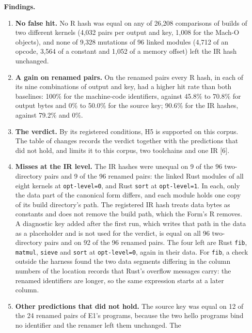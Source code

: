\documentclass[10pt,letterpaper]{article}
\newcounter{none}
\providecommand{\tightlist}{\setlength{\itemsep}{1pt}\setlength{\parskip}{0pt}}
\begin{document}
\textbf{Findings.}

\begin{enumerate}
\def\labelenumi{\arabic{enumi}.}
\tightlist
\item
  \textbf{No false hit.} No R hash was equal on any of 26,208
  comparisons of builds of two different kernels (4,032 pairs per output
  and key, 1,008 for the Mach-O objects), and none of 9,328 mutations of
  96 linked modules (4,712 of an opcode, 3,564 of a constant and 1,052
  of a memory offset) left the IR hash unchanged.
\item
  \textbf{A gain on renamed pairs.} On the renamed pairs every R hash,
  in each of its nine combinations of output and key, had a higher hit
  rate than both baselines: 100\% for the machine-code identifiers,
  against 45.8\% to 70.8\% for output bytes and 0\% to 50.0\% for the
  source key; 90.6\% for the IR hashes, against 79.2\% and 0\%.
\item
  \textbf{The verdict.} By its registered conditions, H5 is supported on
  this corpus. The table of changes records the verdict together with
  the predictions that did not hold, and limits it to this corpus, two
  toolchains and one IR {[}6{]}.
\item
  \textbf{Misses at the IR level.} The IR hashes were unequal on 9 of
  the 96 two-directory pairs and 9 of the 96 renamed pairs: the linked
  Rust modules of all eight kernels at \texttt{opt-\allowbreak{}level=0}, and Rust
  \texttt{sort} at \texttt{opt-\allowbreak{}level=1}. In each, only the data part of
  the canonical form differs, and each module holds one copy of its
  build directory's path. The registered IR hash treats data bytes as
  constants and does not remove the build path, which the Form's R
  removes. A diagnostic key added after the first run, which writes that
  path in the data as a placeholder and is not used for the verdict, is
  equal on all 96 two-directory pairs and on 92 of the 96 renamed pairs.
  The four left are Rust \texttt{fib}, \texttt{matmul}, \texttt{sieve}
  and \texttt{sort} at \texttt{opt-\allowbreak{}level=0}, again in their data. For
  \texttt{fib}, a check outside the harness found the two data segments
  differing in the column numbers of the location records that Rust's
  overflow messages carry: the renamed identifiers are longer, so the
  same expression starts at a later column.
\item
  \textbf{Other predictions that did not hold.} The source key was equal
  on 12 of the 24 renamed pairs of E1's programs, because the two hello
  programs bind no identifier and the renamer left them unchanged. The

\end{enumerate}
\end{document}
